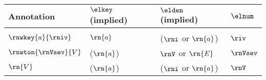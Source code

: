 \begin{tabular}{l|lll}
Annotation & $\elkey$ (implied)       & $\elden$ (implied)       & $\elnum$ \\
\hline \\
$\rnwkey{a}{\rniv}$         & $\rn{a}$              & ($\rni$ or $\rn{a}$)       & $\riv$       \\
$\rnwton{\rnVsev}{V}$       & ($\rn{a}$)            & $\rnV$ or $\rn{E}$         & $\rnVsev$       \\
$\rn{V}$                    & ($\rn{a}$)            & ($\rni$ or $\rn{a}$)       & $\rnV$    
\end{tabular}
